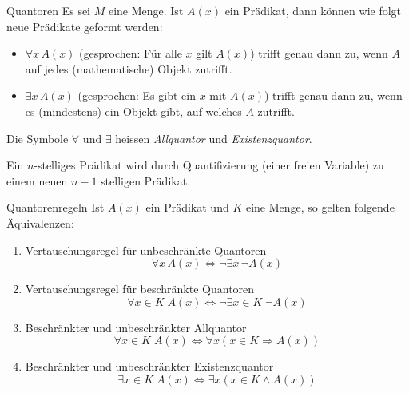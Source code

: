 \begin{concept}{Quantoren}
Es sei $M$ eine Menge. Ist $A(x)$ ein Prädikat, dann können wie folgt neue Prädikate geformt werden:
\begin{itemize}
\item $\forall x\,A(x)$ (gesprochen: Für alle $x$ gilt $A(x)$) trifft genau dann zu, wenn $A$ auf jedes (mathematische) Objekt zutrifft.
\item $\exists x\,A(x)$ (gesprochen: Es gibt ein $x$ mit $A(x)$) trifft genau dann zu, wenn es (mindestens) ein  Objekt gibt, auf welches $A$ zutrifft.
\end{itemize}
Die Symbole $\forall$ und $\exists$ heissen \textit{Allquantor} und \textit{Existenzquantor}.
\end{concept}

\begin{comment}
\begin{remark}
In mathematischen Texten werden Prädikate von der Form $\exists x\,A(x)$ oft als ``es gibt \textbf{mindestens} ein $x$ mit $A(x)$'' ausgedrückt. Diese Ausdrucksform ist inhaltliche gleichbedeutend mit ``es gibt ein $x$ mit $A(x)$''. Auch in diesem Text werden wir beide sprechweisen synonym verwenden.
\end{remark}
\end{comment}

\begin{remark}
Ein $n$-stelliges Prädikat wird durch Quantifizierung (einer freien Variable) zu einem neuen $n-1$ stelligen Prädikat.
\end{remark}

\begin{lemma}{Quantorenregeln}
 Ist $A(x)$ ein Prädikat und $K$ eine Menge, so gelten folgende Äquivalenzen:
\begin{enumerate}
 \item Vertauschungsregel für unbeschränkte Quantoren
\[
 \forall x\, A(x)\Leftrightarrow \neg\exists x\,\neg A(x)
\]
\item Vertauschungsregel für beschränkte Quantoren
\[
 \forall x\in K \;A(x)\Leftrightarrow \neg\exists x\in K\;\neg A(x)
\]
\item Beschränkter und unbeschränkter Allquantor
\[
 \forall x\in K\;A(x)\Leftrightarrow \forall x(x\in K\Rightarrow A(x))
\]
\item Beschränkter und unbeschränkter Existenzquantor
\[
\exists x\in K\; A(x)\Leftrightarrow \exists x(x\in K\wedge A(x))
\]
\end{enumerate}
\end{lemma}

